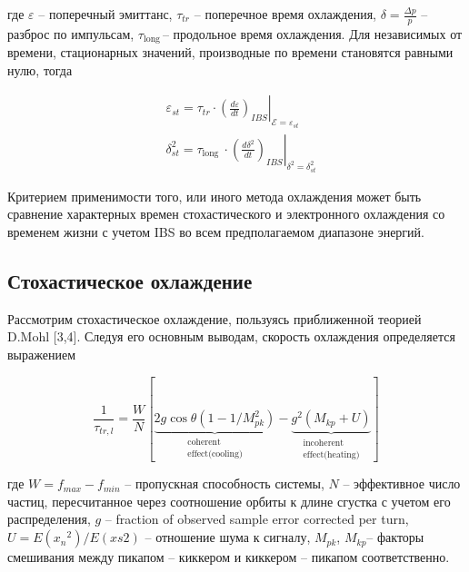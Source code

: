 \noindent где $\varepsilon$ – поперечный эмиттанс, $\tau_{tr}$ – поперечное время охлаждения, $\delta=\frac{\Delta p}{p}$ – разброс по импульсам, $\tau_{\mathrm{long\ }}$– продольное время охлаждения.
Для независимых от времени, стационарных значений, производные по времени становятся равными нулю, тогда

\begin{equation}
\begin{aligned}
& \varepsilon_{s t}=\left.\tau_{t r} \cdot\left(\frac{d \varepsilon}{d t}\right)_{I B S}\right|_{\mathcal{E}=\varepsilon_{s t}} \\
& \delta_{s t}^2=\left.\tau_{\text {long }} \cdot\left(\frac{d \delta^2}{d t}\right)_{I B S}\right|_{\delta^2=\delta_{s t}^2}
\end{aligned}
\end{equation}

Критерием применимости того, или иного метода охлаждения может быть сравнение характерных времен стохастического и электронного охлаждения со временем жизни с учетом IBS во всем предполагаемом диапазоне энергий.
	
		\subsection{Стохастическое охлаждение}

\par Рассмотрим стохастическое охлаждение, пользуясь приближенной теорией D.Mohl [3,4]. Следуя его основным выводам, скорость охлаждения определяется выражением		
	
\begin{equation}
\frac{1}{\tau_{t r, l}}=\frac{W}{N}[\underbrace{2 g \cos \theta\left(1-1 / M_{p k}^2\right)}_{\begin{array}{c}
\text { coherent } \\
\text { effect(cooling) }
\end{array}}-\underbrace{g^2\left(M_{k p}+U\right)}_{\begin{array}{c}
\text { incoherent } \\
\text { effect(heating) }
\end{array}}]
\end{equation}	

\noindent где $W=f_{max}-f_{min}$ – пропускная способность системы, $N$ – эффективное число частиц, пересчитанное через соотношение орбиты к длине сгустка с учетом его распределения, $g$ – fraction of observed sample error corrected per turn, $U=E({x_n}^2)/E(xs2)$ – отношение шума к сигналу, $M_{pk}$, $M_{kp}$– факторы смешивания между пикапом – киккером и киккером – пикапом соответственно.

